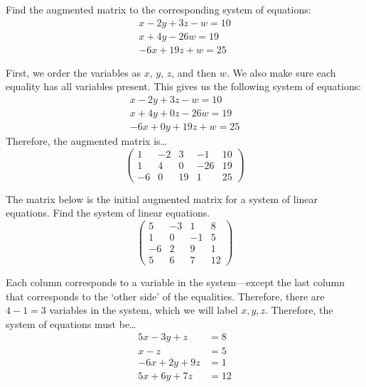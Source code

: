 \documentclass[11pt,letterpaper]{article}
\begin{document}

 Find the augmented matrix to the corresponding system of equations:
	\[
	\begin{gathered}
	x - 2y + 3z - w= 10 \\
	x + 4y - 26w= 19 \\
	-6x + 19z + w= 25
	\end{gathered}
	\] \pspace

\sol First, we order the variables as $x$, $y$, $z$, and then $w$. We also make sure each equality has all variables present. This gives us the following system of equations:
	\[
	\begin{gathered}
	x - 2y + 3z - w= 10 \\
	x + 4y + 0z - 26w= 19 \\
	-6x + 0y + 19z + w= 25
	\end{gathered}
	\]
Therefore, the augmented matrix is\dots
	\[
	\begin{pmatrix}
	1 & -2 & 3 & -1 & 10 \\
	1 & 4 & 0 & -26 & 19 \\
	-6 & 0 & 19 & 1 & 25
	\end{pmatrix}
	\]



\newpage



 The matrix below is the initial augmented matrix for a system of linear equations. Find the system of linear equations. 
	\[
	\begin{pmatrix}
	5 & -3 & 1 & 8 \\
	1 & 0 & -1 & 5 \\
	-6 & 2 & 9 & 1 \\
	5 & 6 & 7 & 12
	\end{pmatrix}
	\] \pspace

\sol Each column corresponds to a variable in the system---except the last column that corresponds to the `other side' of the equalities. Therefore, there are $4 - 1= 3$ variables in the system, which we will label $x, y, z$. Therefore, the system of equations must be\dots
	\[
	\begin{aligned}
	5x - 3y + z&= 8 \\
	x - z&= 5 \\
	-6x + 2y + 9z&= 1 \\
	5x + 6y + 7z&= 12
	\end{aligned}
	\]
\end{document}
